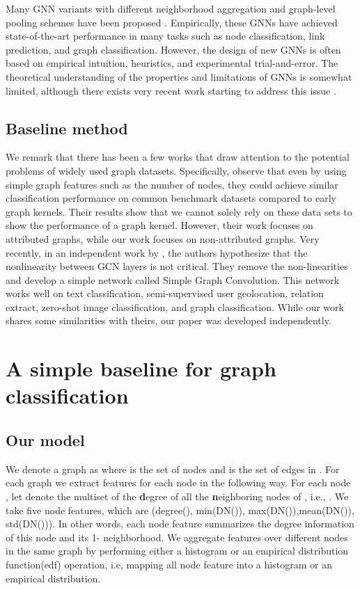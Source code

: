 \documentclass[11pt,onecolumn]{article}
\begin{document}
Many GNN variants with different neighborhood aggregation and graph-level pooling schemes have been proposed \cite{defferrard2016convolutional, duvenaud2015convolutional, hamilton2017inductive, li2015gated, kearnes2016molecular, kipf2016semi, velickovic2017graph, ying2018hierarchical}. 
Empirically, these GNNs have achieved state-of-the-art performance in many tasks such as node classification, link prediction, and graph classification. However, the design of new GNNs is often based on empirical intuition, heuristics, and experimental trial-and-error. The theoretical understanding of the properties and limitations of GNNs is somewhat limited, although there exists very recent work starting to address this issue \cite{xu2018powerful}. 

\subsection{Baseline method}
We remark that there has been a few works that draw attention to the potential problems of widely used graph datasets. Specifically, \cite{yuliia2015graph} observe that even by using simple graph features such as the number of nodes, they could achieve similar classification performance on common benchmark datasets compared to early graph kernels.  Their results show that we cannot solely rely on these data sets to show the performance of a graph kernel. However, their work focuses on attributed graphs, while our work focuses on non-attributed graphs. Very recently, in an independent work by \cite{wu2019simplifying}, the authors hypothesize that the nonlinearity between GCN layers is not critical. They remove the non-linearities and develop a simple network called Simple Graph Convolution. This network works well on text classification, semi-supervised user geolocation, relation extract, zero-shot image classification, and graph classification. While our work shares some similarities with theirs, our paper was developed independently. 

\section{A simple baseline for graph classification}
\subsection{Our model}
We denote a graph as  where  is the set of nodes and  is the set of edges in . For each graph  we extract features for each node in the following way. For each node , let  denote the multiset of the \textbf{d}egree of all the \textbf{n}eighboring nodes of , i.e., . We take five node features, which are (degree(), min(DN()), max(DN()),mean(DN()), std(DN())). In other words, each node feature summarizes the degree information of this node and its 1- neighborhood. We aggregate features over different nodes in the same graph by performing either a histogram or an empirical distribution function(edf) operation, i.e, mapping all node feature into a histogram or an empirical distribution. 
\end{document}
